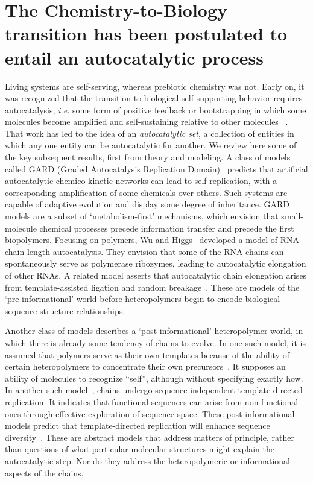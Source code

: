 \documentclass[5p,times]{elsarticle}
\begin{document}
 \section{The Chemistry-to-Biology transition has been postulated to entail an autocatalytic 
process}
 
 Living systems are self-serving, whereas prebiotic chemistry was not.  Early on, it was 
recognized 
that the transition to biological self-supporting behavior requires autocatalysis, \emph{i.e.} some 
form of positive feedback or 
bootstrapping in which some molecules become amplified and self-sustaining relative to other 
molecules 
~\cite{eigen1971selforganization,Eigen1977,Eigen1978,Dyson1985,Prigogine1989,Kauffman1986}.  That 
work has led to the idea of an \emph{autocatalytic set}, a collection of entities in which any one 
entity can be autocatalytic for another.  We review here some of the key subsequent results, first 
from theory and modeling.  A class of models called GARD (Graded Autocatalysis Replication 
Domain)~\cite{segre1998graded,Segre2000,Markovitch2012} predicts that artificial autocatalytic 
chemico-kinetic networks can lead to self-replication, with a corresponding amplification of some 
chemicals over others. Such systems are capable of adaptive evolution and display some degree of 
inheritance.  GARD models are a subset of `metabolism-first' mechanisms, which envision that 
small-molecule chemical processes precede information transfer and precede the first biopolymers.  
Focusing on polymers, Wu and Higgs~\cite{Wu2009} developed a model of RNA chain-length 
autocatalysis.  They envision that some of the RNA chains can spontaneously serve as polymerase 
ribozymes, leading to autocatalytic elongation of other RNAs.  A related model asserts that 
autocatalytic chain elongation arises from template-assisted ligation and random 
breakage~\cite{Tkachenko2014}.  These are models of the `pre-informational' world before 
heteropolymers begin to encode biological sequence-structure relationships.  
 
 Another class of models describes a `post-informational' heteropolymer world, in which there is 
already some tendency of chains to evolve.  In one such model, it is assumed that polymers serve 
as 
their own templates because of the ability of certain heteropolymers to concentrate their own 
precursors~\cite{nowak2008prevolutionary,Ohtsuki2009,Chen2012,Derr2012}.  It supposes an ability 
of 
molecules to recognize ``self'', although without specifying exactly how.  In another such 
model~\cite{Walker2012}, chains undergo sequence-independent template-directed replication.  It 
indicates that functional sequences can arise from non-functional ones through effective 
exploration of sequence space.  These post-informational models predict that template-directed 
replication will enhance sequence diversity~\cite{Derr2012}.   These are abstract models that 
address matters of principle, rather than questions of what particular molecular structures might 
explain the autocatalytic step. Nor do they address the heteropolymeric or informational aspects 
of 
the chains.
 
\end{document}

